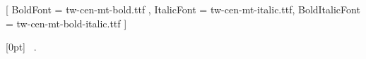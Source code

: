 \usepackage[utf8]{inputenc} %

\usepackage{fontspec} %
\setmainfont{tw-cen-mt.ttf}[
BoldFont = tw-cen-mt-bold.ttf ,
ItalicFont = tw-cen-mt-italic.ttf,
BoldItalicFont = tw-cen-mt-bold-italic.ttf ]

\setlength{\parindent}{0pt} %

\usepackage{enumitem}
\renewcommand*{\theenumi}{\thesection.\arabic{enumi}} %
\renewcommand*{\theenumii}{\theenumi.\arabic{enumii}} %
\usepackage{hyperref} %

\usepackage[portuguese]{babel}
\usepackage{fancyhdr}
\pagestyle{fancy}
\setlength{\headheight}{26pt}
\lhead{}

\setlength\parskip{2ex} %

\usepackage{titlesec} %
\titlespacing*{\chapter}{0pt}{10pt}{10pt}


\usepackage{titletoc}%
  [0pt]%
  {\bfseries}%
  {\chaptername\ \thecontentslabel.\quad}%
  {}%
  {\hfill\contentspage}%


\renewcommand{\thechapter}{\Roman{chapter}} %
\renewcommand{\thesection}{\Roman{section}} %
\renewcommand{\thesubsection}{\Roman{subsection}} %


\usepackage{etoolbox}
\makeatletter
\patchcmd{\chapter}{\if@openright\cleardoublepage\else\clearpage\fi}{}{}{}
\makeatother
